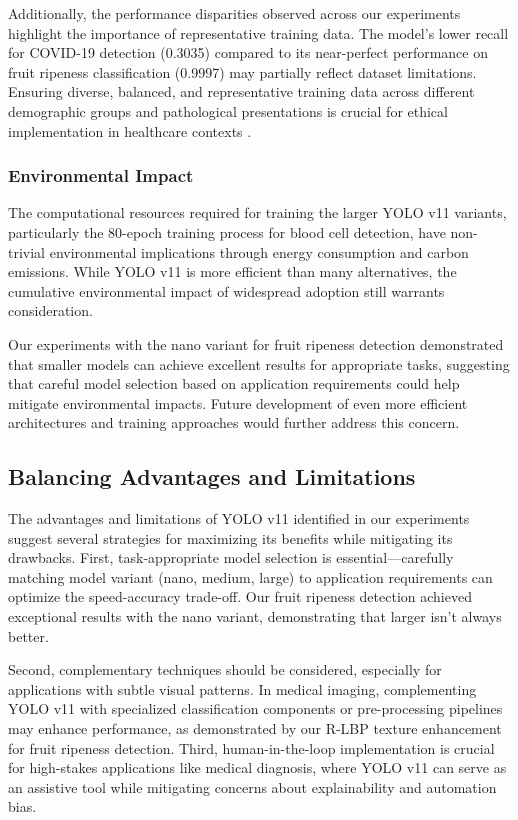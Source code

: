 \begin{multicols}{2}
Additionally, the performance disparities observed across our experiments highlight the importance of representative training data. The model's lower recall for COVID-19 detection (0.3035) compared to its near-perfect performance on fruit ripeness classification (0.9997) may partially reflect dataset limitations. Ensuring diverse, balanced, and representative training data across different demographic groups and pathological presentations is crucial for ethical implementation in healthcare contexts \citep{electronics8030292}.

\subsubsection{Environmental Impact}
The computational resources required for training the larger YOLO v11 variants, particularly the 80-epoch training process for blood cell detection, have non-trivial environmental implications through energy consumption and carbon emissions. While YOLO v11 is more efficient than many alternatives, the cumulative environmental impact of widespread adoption still warrants consideration.

Our experiments with the nano variant for fruit ripeness detection demonstrated that smaller models can achieve excellent results for appropriate tasks, suggesting that careful model selection based on application requirements could help mitigate environmental impacts. Future development of even more efficient architectures and training approaches would further address this concern.

\subsection{Balancing Advantages and Limitations}

The advantages and limitations of YOLO v11 identified in our experiments suggest several strategies for maximizing its benefits while mitigating its drawbacks. First, task-appropriate model selection is essential—carefully matching model variant (nano, medium, large) to application requirements can optimize the speed-accuracy trade-off. Our fruit ripeness detection achieved exceptional results with the nano variant, demonstrating that larger isn't always better. 

Second, complementary techniques should be considered, especially for applications with subtle visual patterns. In medical imaging, complementing YOLO v11 with specialized classification components or pre-processing pipelines may enhance performance, as demonstrated by our R-LBP texture enhancement for fruit ripeness detection. Third, human-in-the-loop implementation is crucial for high-stakes applications like medical diagnosis, where YOLO v11 can serve as an assistive tool while mitigating concerns about explainability and automation bias.


\end{multicols}
